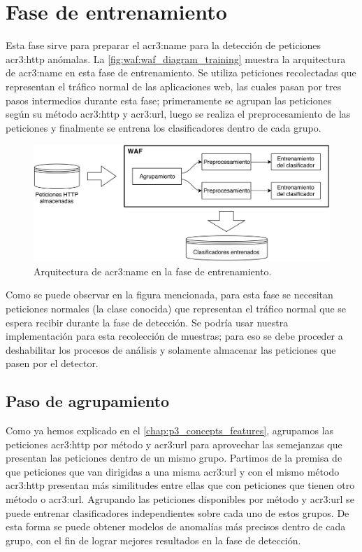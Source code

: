 \section{Fase de entrenamiento}

Esta fase sirve para preparar el \gls{acr3:name} para la detección de
peticiones \gls{acr3:http} anómalas. La \autoref{fig:waf:waf_diagram_training}
muestra la arquitectura de \gls{acr3:name} en esta fase de entrenamiento.
Se utiliza peticiones recolectadas que representan el tráfico normal de
las aplicaciones web, las cuales pasan por tres pasos intermedios durante
esta fase; primeramente se agrupan las peticiones según su método
\gls{acr3:http} y \gls{acr3:url}, luego se realiza el preprocesamiento
de las peticiones y finalmente se entrena los clasificadores dentro de
cada grupo.

\begin{figure}[ht]
    \centering
    \includegraphics[width=\linewidth]{images/waf-diagram-training.png}

    \caption{Arquitectura de \gls{acr3:name} en la fase de
        entrenamiento.}
    \label{fig:waf:waf_diagram_training}
\end{figure}

Como se puede observar en la figura mencionada, para esta fase se necesitan
peticiones normales (la clase conocida) que representan el tráfico normal
que se espera recibir durante la fase de detección. Se podría usar nuestra
implementación para esta recolección de muestras; para eso se debe proceder
a deshabilitar los procesos de análisis y solamente almacenar las peticiones
que pasen por el detector.


\subsection{Paso de agrupamiento}

Como ya hemos explicado en el \autoref{chap:p3_concepts_features},
agrupamos las peticiones \gls{acr3:http} por método y \gls{acr3:url}
para aprovechar las semejanzas que presentan las peticiones dentro de
un mismo grupo. Partimos de la premisa de que peticiones que van dirigidas
a una misma \gls{acr3:url} y con el mismo método \gls{acr3:http} presentan
más similitudes entre ellas que con peticiones que tienen otro método o
\gls{acr3:url}. Agrupando las peticiones disponibles por método y
\gls{acr3:url} se puede entrenar clasificadores independientes sobre
cada uno de estos grupos. De esta forma se puede obtener modelos de
anomalías más precisos dentro de cada grupo, con el fin de lograr mejores
resultados en la fase de detección.


